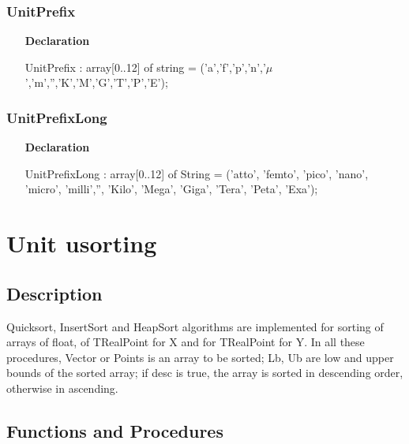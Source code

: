 \documentclass[12pt,a4paper,oneside]{report}
\newcommand{\lmath}[1]{   %
	\marginpar{\vspace{#1} 
		\begin{flushright}
			LMath
	\end{flushright} }
}
\newcommand{\declarationitem}[1]{\textbf{#1}}
\begin{document}
\subsubsection{UnitPrefix}
\label{lmunitsformat-UnitPrefix}
\begin{itemize}\item[\declarationitem{Declaration}\hfill]
	\begin{flushleft}
		\begin{ttfamily}
			UnitPrefix  : array[0..12] of string = ('a','f','p','n','$\mu$','m','','K','M','G','T','P','E');\end{ttfamily}
		
	\end{flushleft}
	
\end{itemize}
\subsubsection{UnitPrefixLong}
\label{lmunitsformat-UnitPrefixLong}
\begin{itemize}\item[\declarationitem{Declaration}\hfill]
	\begin{flushleft}
		\begin{ttfamily}
			UnitPrefixLong : array[0..12] of String =
			('atto', 'femto', 'pico', 'nano', 'micro', 'milli','', 'Kilo', 'Mega', 'Giga', 'Tera', 'Peta', 'Exa');\end{ttfamily}
		
	\end{flushleft}
	
\end{itemize}
\section{Unit usorting}\lmath{-24pt}
\label{usorting}
\subsection{Description}
Quicksort, InsertSort and HeapSort algorithms are implemented for sorting of arrays of float, of TRealPoint for X and for TRealPoint for Y. In all these procedures, Vector or Points is an array to be sorted; Lb, Ub are low and upper bounds of the sorted array; if desc is true, the array is sorted in descending order, otherwise in ascending.
\subsection{Functions and Procedures}
\end{document}
